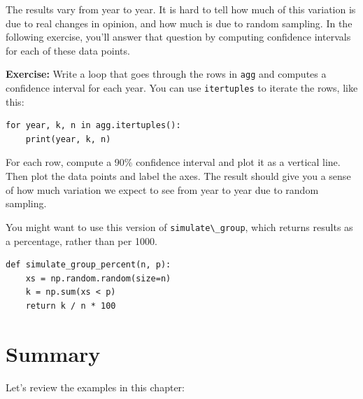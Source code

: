 The results vary from year to year. It is hard to tell how much of this
variation is due to real changes in opinion, and how much is due to
random sampling. In the following exercise, you'll answer that question
by computing confidence intervals for each of these data points.

\textbf{Exercise:} Write a loop that goes through the rows in
\passthrough{\lstinline!agg!} and computes a confidence interval for
each year. You can use \passthrough{\lstinline!itertuples!} to iterate
the rows, like this:

\begin{lstlisting}
for year, k, n in agg.itertuples():
    print(year, k, n)
\end{lstlisting}

For each row, compute a 90\% confidence interval and plot it as a
vertical line. Then plot the data points and label the axes. The result
should give you a sense of how much variation we expect to see from year
to year due to random sampling.

You might want to use this version of
\passthrough{\lstinline!simulate\_group!}, which returns results as a
percentage, rather than per 1000.

\begin{lstlisting}[]
def simulate_group_percent(n, p):
    xs = np.random.random(size=n)
    k = np.sum(xs < p)
    return k / n * 100
\end{lstlisting}

\hypertarget{summary}{%
\section{Summary}\label{summary}}

Let's review the examples in this chapter:

